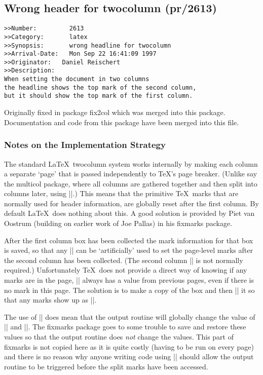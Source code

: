 \documentclass{ltxguide}
\newcommand\Lpack[1]{\mbox{\textsf{#1}}}
\begin{document}
\subsection{Wrong header for twocolumn (pr/2613)}

\begin{verbatim}
>>Number:         2613
>>Category:       latex
>>Synopsis:       wrong headline for twocolumn
>>Arrival-Date:   Mon Sep 22 16:41:09 1997
>>Originator:   Daniel Reischert
>>Description:
When setting the document in two columns
the headline shows the top mark of the second column,
but it should show the top mark of the first column.
\end{verbatim}

Originally fixed in package \Lpack{fix2col} which was merged into
this package. Documentation and code from this package have been
merged into this file.

\subsubsection{Notes on the Implementation Strategy}

The standard \LaTeX\ twocolumn system works internally by making
each column a separate `page' that is passed independently to \TeX's
page breaker. (Unlike say the \Lpack{multicol} package, where all
columns are gathered together and then split into columns later,
using |\vsplit|.) This means that the primitive \TeX\ marks that are
normally used for header information, are globally reset after the
first column. By default \LaTeX\ does nothing about this.
A good solution is provided by Piet van Oostrum (building on earlier
work of Joe Pallas) in his \Lpack{fixmarks} package.

After the first column box has been collected the mark information
for that box is saved, so that any |\firstmark| can be
`artificially' used to set the page-level marks after the second
column has been collected. (The second column |\firstmark| is not
normally required.) Unfortunately \TeX\ does not provide a direct
way of knowing if any marks are in the page, |\firstmark| always has a
value from previous pages, even if there is no mark in this page.
The solution is to make a copy of the box and then |\vsplit| it
so that any marks show up as |\splitfirstmark|.

The use of |\vsplit| does mean that the output routine will globally
change the value of |\splitfirstmark| and
|\splitbotmark|. The \Lpack{fixmarks} package goes to some trouble
to save and restore these values so that the output routine does
\emph{not} change the values. This part of \Lpack{fixmarks} is not
copied here as it is quite costly (having to be run on every page) and
there is no reason why anyone writing code using |\vsplit| should
allow the output routine to be triggered before the split marks have
been accessed.
\end{document}
